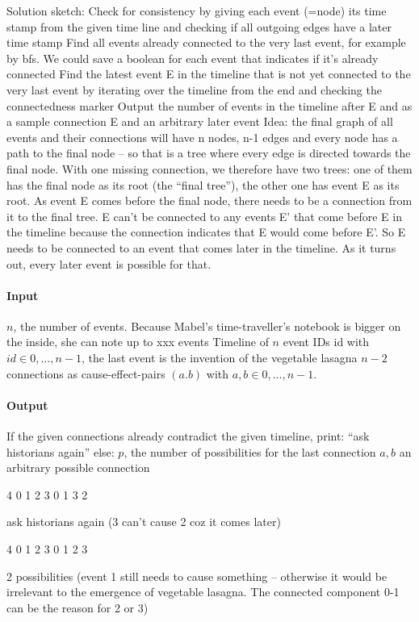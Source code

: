Solution sketch:
Check for consistency by giving each event (=node) its time stamp from the given time line and checking if all outgoing edges have a later time stamp
Find all events already connected to the very last event, for example by bfs. We could save a boolean for each event that indicates if it’s already connected
Find the latest event E in the timeline that is not yet connected to the very last event by iterating over the timeline from the end and checking the connectedness marker
Output the number of events in the timeline after E and as a sample connection E and an arbitrary later event
Idea: the final graph of all events and their connections will have n nodes, n-1 edges and every node has a path to the final node – so that is a tree where every edge is directed towards the final node. With one missing connection, we therefore have two trees: one of them has the final node as its root (the “final tree”), the other one has event E as its root. As event E comes before the final node, there needs to be a connection from it to the final tree. E can’t be connected to any events E’ that come before E in the timeline because the connection indicates that E would come before E’. So E needs to be connected to an event that comes later in the timeline. As it turns out, every later event is possible for that.

\paragraph*{Input}

$n$, the number of events. Because Mabel's time-traveller’s notebook is bigger on the inside, she can note up to xxx events
Timeline of $n$ event IDs id with $id \in {0,...,n-1}$, the last event is the invention of the vegetable lasagna
$n-2$ connections as cause-effect-pairs $(a.b)$ with $a,b \in {0,...,n-1}$.

\paragraph*{Output}

If the given connections already contradict the given timeline, print: “ask historians again”
else:
$p$, the number of possibilities for the last connection
$a, b$ an arbitrary possible connection

\begin{samples}

4
0 1 2 3
0 1
3 2

ask historians again (3 can’t cause 2 coz it comes later)


4
0 1 2 3
0 1
2 3

2 possibilities
(event 1 still needs to cause something – otherwise it would be irrelevant to the emergence of vegetable lasagna. The connected component 0-1 can be the reason for 2 or 3)

\end{samples}


